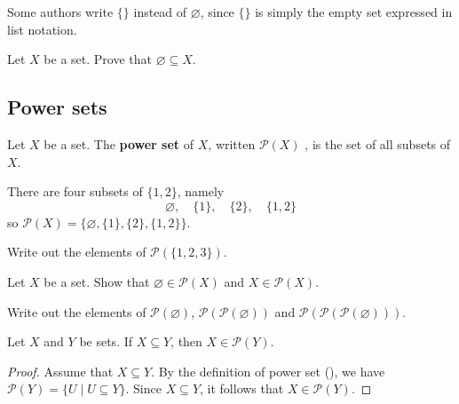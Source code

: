 Some authors write $\{ \}$ instead of $\varnothing$, since $\{ \}$ is simply the empty set expressed in list notation.

\begin{exercise}
\label{exEmptySetSubsetOfEverySet}
Let $X$ be a set. Prove that $\varnothing \subseteq X$.
\end{exercise}

\subsection*{Power sets}

\begin{definition}
\label{defPowerSet}
Let $X$ be a set. The \textbf{power set} of $X$, written $\mathcal{P}(X)$ , is the set of all subsets of $X$.
\end{definition}

\begin{example}
There are four subsets of $\{ 1, 2 \}$, namely
\[ \varnothing, \quad \{ 1 \}, \quad \{ 2 \}, \quad \{ 1, 2 \} \]
so $\mathcal{P}(X) = \{\varnothing, \{ 1 \}, \{ 2 \}, \{ 1, 2 \}\}$.
\end{example}

\begin{exercise}
Write out the elements of $\mathcal{P}(\{1, 2, 3\})$.
\end{exercise}

\begin{exercise}
Let $X$ be a set. Show that $\varnothing \in \mathcal{P}(X)$ and $X \in \mathcal{P}(X)$.
\end{exercise}

\begin{exercise}
Write out the elements of $\mathcal{P}(\varnothing)$, $\mathcal{P}(\mathcal{P}(\varnothing))$ and $\mathcal{P}(\mathcal{P}(\mathcal{P}(\varnothing)))$.
\end{exercise}

\begin{example}
\label{exSubsetImpliesPowerSetMembership}
Let $X$ and $Y$ be sets. If $X \subseteq Y$, then $X \in \mathcal{P}(Y)$.

\begin{proof}
Assume that $X \subseteq Y$. By the definition of power set (), we have $\mathcal{P}(Y) = \{U \mid U \subseteq Y\}$. Since $X \subseteq Y$, it follows that $X \in \mathcal{P}(Y)$.
\end{proof}
\end{example}

